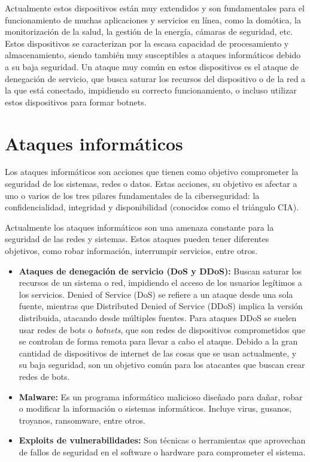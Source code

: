 Actualmente estos dispositivos están muy extendidos y son fundamentales para el funcionamiento de muchas aplicaciones y servicios en línea, como la domótica, la monitorización de la salud, la gestión de la energía, cámaras de seguridad, etc. Estos dispositivos se caracterizan por la escasa capacidad de procesamiento y almacenamiento, siendo también muy susceptibles a ataques informáticos debido a su baja seguridad. Un ataque muy común en estos dispositivos es el ataque de denegación de servicio, que busca saturar los recursos del dispositivo o de la red a la que está conectado, impidiendo su correcto funcionamiento, o incluso utilizar estos dispositivos para formar botnets. ~\cite{kolias2017}


\section{Ataques informáticos}
Los ataques informáticos son acciones que tienen como objetivo comprometer la seguridad de los sistemas, redes o datos.
Estas acciones, su objetivo es afectar a uno o varios de los tres pilares fundamentales de la ciberseguridad: la confidencialidad, integridad y disponibilidad (conocidos como el triángulo CIA).~\cite{NicholasEdwards2020, Chaeikar2012} 

Actualmente los ataques informáticos son una amenaza constante para la seguridad de las redes y sistemas. Estos ataques pueden tener diferentes objetivos, como robar información, interrumpir servicios, entre otros.

\begin{itemize}
    \item \textbf{Ataques de denegación de servicio (DoS y DDoS):} Buscan saturar los recursos de un sistema o red, impidiendo el acceso de los usuarios legítimos a los servicios. Denied of Service (DoS) se refiere a un ataque desde una sola fuente, mientras que Distributed Denied of Service (DDoS) implica la versión distribuida, atacando desde múltiples fuentes. Para ataques DDoS se suelen usar redes de bots o \textit{botnets}, que son redes de dispositivos comprometidos que se controlan de forma remota para llevar a cabo el ataque. Debido a la gran cantidad de dispositivos de internet de las cosas que se usan actualmente, y su baja seguridad, son un objetivo común para los atacantes que buscan crear redes de bots. ~\cite{kolias2017}

    \item \textbf{Malware:} Es un programa informático malicioso diseñado para dañar, robar o modificar la información o sistemas informáticos. Incluye virus, gusanos, troyanos, ransomware, entre otros. ~\cite{SushilJajodia2025}

    \item \textbf{Exploits de vulnerabilidades:} Son técnicas o herramientas que aprovechan de fallos de seguridad en el software o hardware para comprometer el sistema. ~\cite{SushilJajodia2025}
\end{itemize}

